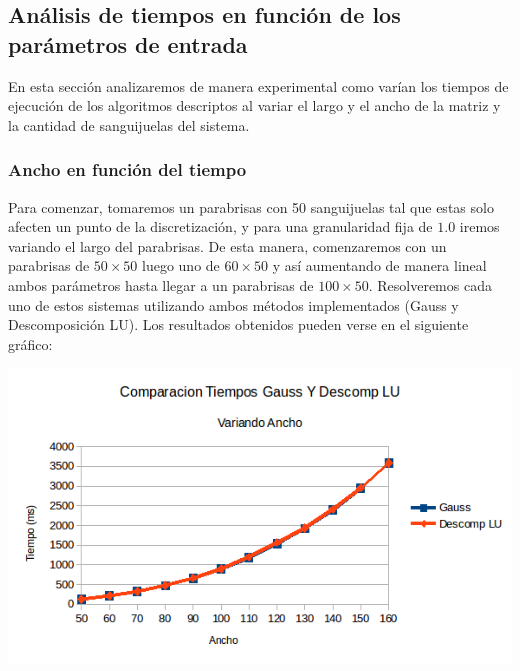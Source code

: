 \subsection{Análisis de tiempos en función de los parámetros de entrada}
En esta sección analizaremos de manera experimental como varían los tiempos de ejecución de los algoritmos descriptos al variar el largo y el ancho de la matriz y la cantidad de sanguijuelas del sistema.

\subsubsection{Ancho en función del tiempo}
Para comenzar, tomaremos un parabrisas con 50 sanguijuelas tal que estas solo afecten un punto de la discretización, y para una granularidad fija de $1.0$ iremos variando el largo del parabrisas. De esta manera, comenzaremos con un parabrisas de $50 \times 50$ luego uno de $60 \times 50$ y así aumentando de manera lineal ambos parámetros hasta llegar a un parabrisas de $100 \times 50$. Resolveremos cada uno de estos sistemas utilizando ambos métodos implementados (Gauss y Descomposición LU). Los resultados obtenidos pueden verse en el siguiente gráfico:

\begin{center}
 \includegraphics[width=400pt]{imagenes/testeo/anchoGauss.png}
\end{center}

